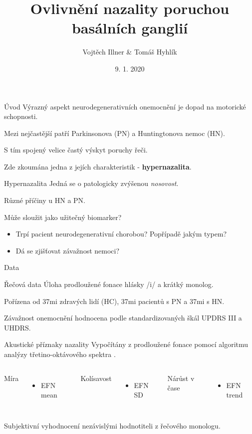 \documentclass{beamer}
\title{Ovlivnění nazality poruchou basálních ganglií}
\date{9. 1. 2020}
\author{Vojtěch Illner \& Tomáš Hyhlík}
\institute{Semestrální projekt B2M31AEDA, 2019/20}
\begin{document}
  \maketitle

  \begin{frame}{Úvod}
    Výrazný aspekt neurodegenerativních onemocnění je dopad na motorické schopnosti.
    
    Mezi nejčastější patří Parkinsonova (PN) a Huntingtonova nemoc (HN).
    
    S tím spojený velice častý výskyt poruchy řeči.
    
    Zde zkoumána jedna z jejích charakteristik - \textbf{hypernazalita}.
    
  \end{frame}

  \begin{frame}{Hypernazalita}
	Jedná se o patologicky zvýšenou \emph{nosovost}.
	
	Různé příčiny u HN a PN.
	
	Může sloužit jako užitečný biomarker? 
	\begin{itemize}
		\item Trpí pacient neurodegenerativní chorobou? Popřípadě jakým typem?
		\item Dá se zjišťovat závažnost nemoci? 
	\end{itemize}
  \end{frame}

  \begin{frame}{Data}
  	\begin{alertblock}{Řečová data}
  		Úloha prodloužené fonace hlásky /i/ a krátký monolog.
  		
  		Pořízena od 37mi zdravých lidí (HC), 37mi pacientů s PN a 37mi s HN.
  		
  		Závažnost onemocnění hodnocena podle standardizovaných škál UPDRS III a UHDRS.
  	\end{alertblock}
    \begin{alertblock}{Akustické příznaky nazality}
    	Vypočítány z prodloužené fonace pomocí algoritmu analýzy třetino-oktávového spektra \cite{algorithm}.
    	\begin{columns}[T,onlytextwidth]
    		Míra
    		\begin{itemize}
    			\item EFN mean
    		\end{itemize}
    		
    		Kolísavost
    		\begin{itemize}
    			\item EFN SD
    		\end{itemize}
    		
    		Nárůst v čase
    		\begin{itemize}
    			\item EFN trend
    		\end{itemize}
    	\end{columns}
    Subjektivní vyhodnocení nezávislými hodnotiteli z řečového monologu.
    \end{alertblock}
  \end{frame}
\end{document}
